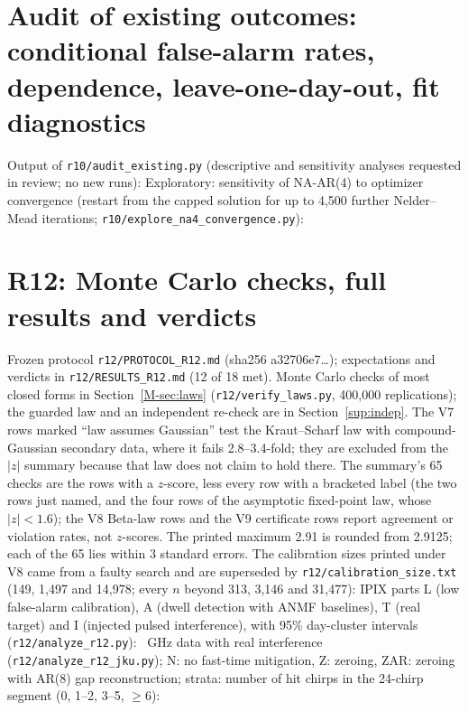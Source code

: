 \documentclass[10pt]{article}
\begin{document}
\section{Audit of existing outcomes: conditional false-alarm rates, dependence, leave-one-day-out, fit diagnostics}
Output of \texttt{r10/audit\_existing.py} (descriptive and sensitivity analyses requested in review; no new runs):
\noindent Exploratory: sensitivity of NA-AR(4) to optimizer convergence (restart from the capped solution for up to 4,500 further Nelder--Mead iterations; \texttt{r10/explore\_na4\_convergence.py}):



\section{R12: Monte Carlo checks, full results and verdicts}\label{sup:r12}
Frozen protocol \texttt{r12/PROTOCOL\_R12.md} (sha256 a32706e7\ldots); expectations and verdicts in \texttt{r12/RESULTS\_R12.md} (12 of 18 met). Monte Carlo checks of most closed forms in Section~\ref{M-sec:laws} (\texttt{r12/verify\_laws.py}, 400,000 replications); the guarded law and an independent re-check are in Section~\ref{sup:indep}. The V7 rows marked ``law assumes Gaussian'' test the Kraut--Scharf law with compound-Gaussian secondary data, where it fails 2.8--3.4-fold; they are excluded from the $|z|$ summary because that law does not claim to hold there. The summary's 65 checks are the rows with a $z$-score, less every row with a bracketed label (the two rows just named, and the four rows of the asymptotic fixed-point law, whose $|z|<1.6$); the V8 Beta-law rows and the V9 certificate rows report agreement or violation rates, not $z$-scores. The printed maximum 2.91 is rounded from 2.9125; each of the 65 lies within 3 standard errors. The calibration sizes printed under V8 came from a faulty search and are superseded by \texttt{r12/calibration\_size.txt} (149, 1,497 and 14,978; every $n$ beyond 313, 3,146 and 31,477):
\noindent IPIX parts L (low false-alarm calibration), A (dwell detection with ANMF baselines), T (real target) and I (injected pulsed interference), with 95\% day-cluster intervals (\texttt{r12/analyze\_r12.py}):
~GHz data with real interference (\texttt{r12/analyze\_r12\_jku.py}); N: no fast-time mitigation, Z: zeroing, ZAR: zeroing with AR(8) gap reconstruction; strata: number of hit chirps in the 24-chirp segment (0, 1--2, 3--5, $\ge6$):
\end{document}
